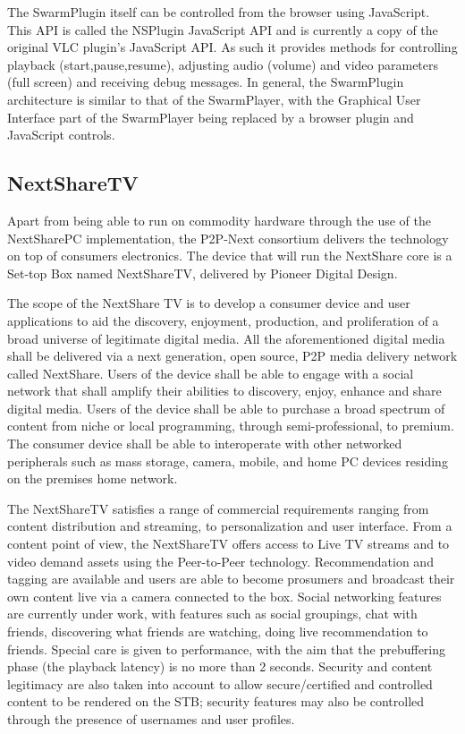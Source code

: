 The SwarmPlugin itself can be controlled from the browser using JavaScript.
This API is called the NSPlugin JavaScript API and is currently a copy of the
original VLC plugin's JavaScript API.  As such it provides
methods for controlling playback (start,pause,resume), adjusting audio
(volume) and video parameters (full screen) and receiving debug messages. In
general, the SwarmPlugin architecture is similar to that of the SwarmPlayer,
with the Graphical User Interface part of the SwarmPlayer being replaced by a
browser plugin and JavaScript controls.

\subsection{NextShareTV}
\label{subsec:multimedia-dist:nextshare-tv}

Apart from being able to run on commodity hardware through the use of the
NextSharePC implementation, the P2P-Next consortium delivers the technology
on top of consumers electronics. The device that will run the NextShare core
is a Set-top Box named NextShareTV, delivered by Pioneer Digital Design.

The scope of the NextShare TV is to develop a consumer device and user
applications to aid the discovery, enjoyment, production, and proliferation of
a broad universe of legitimate digital media. All the aforementioned digital
media shall be delivered via a next generation, open source, P2P media
delivery network called NextShare. Users of the device shall be able to engage
with a social network that shall amplify their abilities to discovery, enjoy,
enhance and share digital media. Users of the device shall be able to purchase
a broad spectrum of content from niche or local programming, through
semi-professional, to premium. The consumer device shall be able to
interoperate with other networked peripherals such as mass storage, camera,
mobile, and home PC devices residing on the premises home network.

The NextShareTV satisfies a range of commercial requirements ranging from
content distribution and streaming, to personalization and user interface.
From a content point of view, the NextShareTV offers access to Live TV streams
and to video demand assets using the Peer-to-Peer technology. Recommendation
and tagging are available and users are able to become prosumers and broadcast
their own content live via a camera connected to the box. Social networking
features are currently under work, with features such as social groupings,
chat with friends, discovering what friends are watching, doing live
recommendation to friends. Special care is given to performance, with the aim
that the prebuffering phase (the playback latency) is no more than 2 seconds.
Security and content legitimacy are also taken into account to allow
secure/certified and controlled content to be rendered on the STB; security
features may also be controlled through the presence of usernames and user
profiles.

